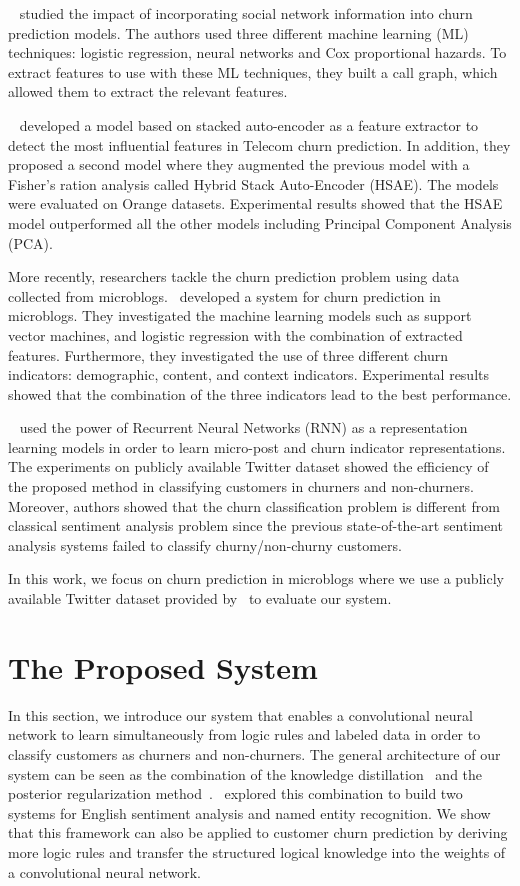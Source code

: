 \documentclass[11pt,letterpaper]{article}
\begin{document}
~\cite{backiel} studied the impact of incorporating social network information into churn prediction models. The authors used three different machine learning (ML) techniques: logistic regression, neural networks and Cox proportional hazards. To extract features to use with these ML techniques, they built a call graph, which allowed them to extract the relevant features.

~\cite{li2016feature} developed a model based on stacked auto-encoder as a feature extractor to detect the most influential features in Telecom churn prediction. In addition, they proposed a second model where they augmented the previous model with a Fisher’s ration analysis called Hybrid Stack Auto-Encoder (HSAE). The models were evaluated on Orange datasets. Experimental results showed that the HSAE model outperformed all the other models including Principal Component Analysis (PCA).

More recently, researchers tackle the churn prediction problem using data collected from microblogs.~\cite{amiri2015} developed a system for churn prediction in microblogs. They investigated the machine learning models such as support vector machines, and logistic regression with the combination of extracted features. Furthermore, they investigated the use of three different churn indicators: demographic, content, and context indicators. Experimental results showed that the combination of the three indicators lead to the best performance.

~\cite{amiri2016} used the power of Recurrent Neural Networks (RNN) as a representation learning models in order to learn micro-post and churn indicator representations. The experiments on publicly available Twitter dataset showed the efficiency of the proposed method in classifying customers in churners and non-churners. Moreover, authors showed that the churn classification problem is different from classical sentiment analysis problem since the previous state-of-the-art sentiment analysis systems failed to classify churny/non-churny customers.

In this work, we focus on churn prediction in microblogs where we use a publicly available Twitter dataset provided by~\cite{amiri2015} to evaluate our system.

\section{The Proposed System}

In this section, we introduce our system that enables a convolutional neural network to learn simultaneously from logic rules and labeled data in order to classify customers as churners and non-churners. The general architecture of our system can be seen as the combination of the knowledge distillation~\cite{hinton2015distilling} and the posterior regularization method~\cite{ganchev}.~\cite{hu} explored this combination to build two systems for English sentiment analysis and named entity recognition. We show that this framework can also be applied to customer churn prediction by deriving more logic rules and transfer the structured logical knowledge into the weights of a convolutional neural network. 
\end{document}

